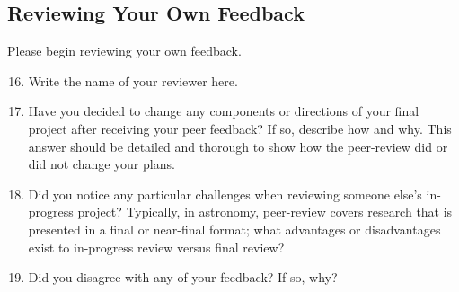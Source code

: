 \documentclass[11pt]{article}%
\begin{document}
\subsection{Reviewing Your Own Feedback}

Please begin reviewing your own feedback.

\begin{enumerate}
\setcounter{enumi}{15}
    \item Write the name of your reviewer here.

    \item Have you decided to change any components or directions of your final project after receiving your peer feedback? If so, describe how and why. This answer should be detailed and thorough to show how the peer-review did or did not change your plans.

    \item Did you notice any particular challenges when reviewing someone else's in-progress project? Typically, in astronomy, peer-review covers research that is presented in a final or near-final format; what advantages or disadvantages exist to in-progress review versus final review?

    \item Did you disagree with any of your feedback? If so, why?

\end{enumerate}
\end{document}
